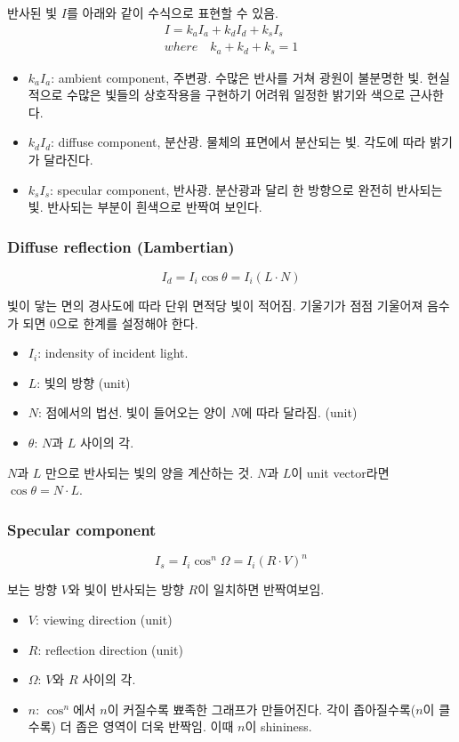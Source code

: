 반사된 빛 $I$를 아래와 같이 수식으로 표현할 수 있음.
$$
\begin{aligned}
  I = k_aI_a + k_dI_d + k_sI_s \\
  where \quad k_a + k_d + k_s = 1
\end{aligned}
$$
\begin{itemize}
  \item $k_aI_a$: ambient component, 주변광. 수많은 반사를 거쳐 광원이 불분명한 빛. 현실적으로 수많은 빛들의 상호작용을 구현하기 어려워 일정한 밝기와 색으로 근사한다.
  \item $k_dI_d$: diffuse component, 분산광. 물체의 표면에서 분산되는 빛. 각도에 따라 밝기가 달라진다.
  \item $k_sI_s$: specular component, 반사광. 분산광과 달리 한 방향으로 완전히 반사되는 빛. 반사되는 부분이 흰색으로 반짝여 보인다.
\end{itemize}

\subsubsection{Diffuse reflection (Lambertian)}

$$
I_d  = I_i \cos{\theta} = I_i(L \cdot N)
$$

빛이 닿는 면의 경사도에 따라 단위 면적당 빛이 적어짐. 기울기가 점점 기울어져 음수가 되면 0으로 한계를 설정해야 한다.

\begin{itemize}
  \item $I_i$: indensity of incident light.
  \item $L$: 빛의 방향 (unit)
  \item $N$: 점에서의 법선. 빛이 들어오는 양이 $N$에 따라 달라짐. (unit)
  \item $\theta$: $N$과 $L$ 사이의 각.
\end{itemize}

$N$과 $L$ 만으로 반사되는 빛의 양을 계산하는 것. $N$과 $L$이 unit vector라면 $\cos \theta = N \cdot L$.

\subsubsection{Specular component}

$$
I_s = I_i\cos^n{\Omega} = I_i(R \cdot V)^n
$$

보는 방향 $V$와 빛이 반사되는 방향 $R$이 일치하면 반짝여보임.

\begin{itemize}
  \item $V$: viewing direction (unit)
  \item $R$: reflection direction (unit)
  \item $\Omega$: $V$와 $R$ 사이의 각.
  \item $n$: $\cos^n$에서 $n$이 커질수록 뾰족한 그래프가 만들어진다. 각이 좁아질수록($n$이 클수록) 더 좁은 영역이 더욱 반짝임. 이때 $n$이 shininess.
\end{itemize}

